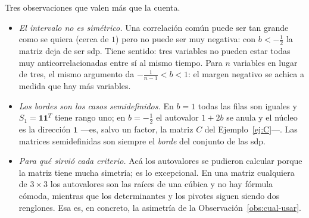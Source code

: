 \begin{example}
\medskip
Tres observaciones que valen más que la cuenta.
\begin{itemize}[leftmargin=*,itemsep=2pt]
\item \emph{El intervalo no es simétrico.} Una correlación común puede ser
tan grande como se quiera (cerca de $1$) pero no puede ser muy negativa: con
$b<-\frac12$ la matriz deja de ser sdp. Tiene sentido: tres variables no
pueden estar todas muy anticorrelacionadas entre sí al mismo tiempo. Para
$n$ variables en lugar de tres, el mismo argumento da $-\frac1{n-1}<b<1$: el
margen negativo se achica a medida que hay más variables.
\item \emph{Los bordes son los casos semidefinidos.} En $b=1$ todas las filas
son iguales y $S_1=\mathbf 1\mathbf 1^T$ tiene rango uno; en $b=-\frac12$ el
autovalor $1+2b$ se anula y el núcleo es la dirección $\mathbf 1$ ---es,
salvo un factor, la matriz $C$ del Ejemplo~\ref{ej:C}---. Las matrices
semidefinidas son siempre el \emph{borde} del conjunto de las sdp.
\item \emph{Para qué sirvió cada criterio.} Acá los autovalores se pudieron
calcular porque la matriz tiene mucha simetría; es lo excepcional. En una
matriz cualquiera de $3\times3$ los autovalores son las raíces de una cúbica y
no hay fórmula cómoda, mientras que los determinantes y los pivotes siguen
siendo dos renglones. Esa es, en concreto, la asimetría de la
Observación~\ref{obs:cual-usar}.
\end{itemize}
\end{example}

